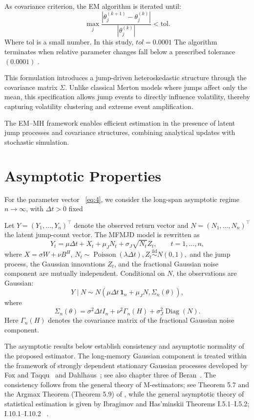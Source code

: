 \documentclass[a4paper,11pt]{amsart}
\theoremstyle{definition}
\theoremstyle{plain}
\theoremstyle{remark}
\newcommand{\1}{\mathbf{1}}
\begin{document}
As covariance criterion, the EM algorithm is iterated until:
\begin{equation*}
	\max_j \frac{|\theta_j^{(k+1)} -\theta_j^{(k)}|} {|\theta_j^{(k)}| }
	< \text{tol}.
\end{equation*}
Where tol is a small number. In this study, $tol = 0.0001$ The algorithm terminates when relative parameter changes fall below a prescribed tolerance $(0.0001)$ .

This formulation introduces a jump-driven heteroskedastic structure through the covariance matrix $\Sigma$. Unlike classical Merton models where jumps affect only the mean, this specification allows jump events to directly influence volatility, thereby capturing volatility clustering and extreme event amplification.

The EM--MH framework enables efficient estimation in the presence of latent jump processes and covariance structures, combining analytical updates with stochastic simulation.
\section{Asymptotic Properties}
For the parameter vector ~\ref{eq:4}, we consider the long-span asymptotic regime
$n\to\infty$, with $\Delta t>0$ fixed

Let
$
Y=(Y_1,\ldots,Y_n)^\top
$
denote the observed return vector and
$
N=(N_1,\ldots,N_n)^\top
$
the latent jump-count vector. The MFMJD model is rewritten as
$$
Y_t = \mu\Delta t+X_t+\mu_JN_t +\sigma_J\sqrt{N_t}Z_t,
\qquad t=1,\ldots,n,
$$
where
$X = \sigma W + \nu B^H$, 
$
N_t\sim\operatorname{Poisson}(\lambda\Delta t), 
 Z_t\stackrel{\mathrm{iid}}{\sim}N(0,1),
$
and the jump process, the Gaussian innovations ${Z_t}$, and the fractional Gaussian noise component are mutually independent. Conditional on $N$, the observations are Gaussian:
$$
Y\mid N \sim N\left(\mu\Delta t\,\mathbf{1}_n+\mu_JN,\Sigma_n(\theta)\right),
$$
where
$$
\Sigma_n(\theta) = \sigma^2\Delta t I_n
+
\nu^2\Gamma_n(H) + \sigma_J^2\operatorname{Diag}(N).
$$
Here $\Gamma_n(H)$ denotes the covariance matrix of the fractional Gaussian noise component.

The asymptotic results below establish consistency and asymptotic normality of the proposed estimator. The long-memory Gaussian component is treated within the framework of strongly dependent stationary Gaussian processes developed by Fox and Taqqu~\cite{FoxTaqqu1986} and Dahlhaus~\cite{Dahlhaus1989}; see also chapter three of Beran~\cite{Beran1994}. The consistency follows from the general theory of
M-estimators; see Theorem 5.7 and the Argmax Theorem
(Theorem 5.9) of \cite{VanDerVaart2000},  while the general asymptotic theory of statistical estimation is given by Ibragimov and Has'minskii Theorems I.5.1–I.5.2; I.10.1–I.10.2 ~\cite{IbragimovHasminskii2013}.
\end{document}
